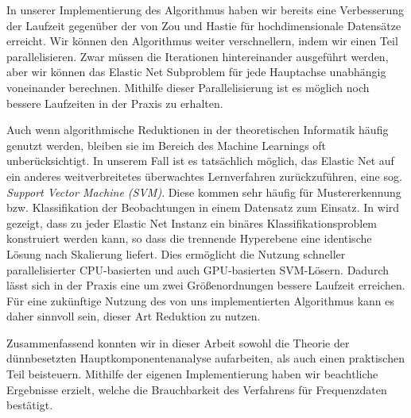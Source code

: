 In unserer Implementierung des Algorithmus haben wir bereits eine Verbesserung der Laufzeit gegenüber der von Zou und Hastie für hochdimensionale Datensätze erreicht. Wir können den Algorithmus weiter verschnellern, indem wir einen Teil parallelisieren. Zwar müssen die Iterationen hintereinander ausgeführt werden, aber wir können das Elastic Net Subproblem für jede Hauptachse unabhängig voneinander berechnen. Mithilfe dieser Parallelisierung ist es möglich noch bessere Laufzeiten in der Praxis zu erhalten.

Auch wenn algorithmische Reduktionen in der theoretischen Informatik häufig genutzt werden, bleiben sie im Bereich des Machine Learnings oft unberücksichtigt. In unserem Fall ist es tatsächlich möglich, das Elastic Net auf ein anderes weitverbreitetes überwachtes Lernverfahren zurückzuführen, eine sog. \textit{Support Vector Machine (SVM)}. Diese kommen sehr häufig für Mustererkennung bzw. Klassifikation der Beobachtungen in einem Datensatz zum Einsatz. In \cite{zhou} wird gezeigt, dass zu jeder Elastic Net Instanz ein binäres Klassifikationsproblem konstruiert werden kann, so dass die trennende Hyperebene eine identische Lösung nach Skalierung liefert. Dies ermöglicht die Nutzung schneller parallelisierter CPU-basierten und auch GPU-basierten SVM-Lösern. Dadurch lässt sich in der Praxis eine um zwei Größenordnungen bessere Laufzeit erreichen. Für eine zukünftige Nutzung des von uns implementierten Algorithmus kann es daher sinnvoll sein, dieser Art Reduktion zu nutzen.

Zusammenfassend konnten wir in dieser Arbeit sowohl die Theorie der dünnbesetzten Hauptkomponentenanalyse aufarbeiten, als auch einen praktischen Teil beisteuern. Mithilfe der eigenen Implementierung haben wir beachtliche Ergebnisse erzielt, welche die Brauchbarkeit des Verfahrens für Frequenzdaten bestätigt. 
